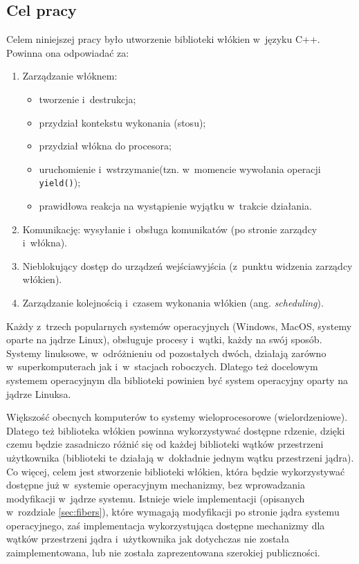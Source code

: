 \documentclass[12pt]{mwart}
\newcommand{\code}{\texttt}
\newcommand{\procbr}{()}
\newcommand{\function}[1]{\code{#1\procbr}}
\begin{document}
\subsection{Cel pracy}
\label{sec:target}
\indent
  Celem niniejszej pracy było utworzenie biblioteki włókien w~języku C++.
	Powinna ona odpowiadać za:
	\begin{enumerate}
		\item Zarządzanie włóknem:
		\begin{itemize}
			\item tworzenie i~destrukcja;
			\item przydział kontekstu wykonania (stosu);
			\item przydział włókna do procesora;
			\item uruchomienie i~wstrzymanie(tzn. w~momencie wywołania operacji \function{yield});
			\item prawidłowa reakcja na wystąpienie wyjątku w~trakcie działania.
		\end{itemize}
		\item Komunikację: wysyłanie i~obsługa komunikatów (po stronie zarządcy i~włókna).
		\item Nieblokujący dostęp do  urządzeń wejścia\dywiz wyjścia (z~punktu widzenia zarządcy włókien).
    \item Zarządzanie kolejnością i~czasem wykonania włókien (ang. \emph{scheduling}). \label{enm:timesch}
	\end{enumerate}
\par
\indent
  Każdy z~trzech popularnych systemów operacyjnych (Windows, MacOS, systemy oparte na jądrze Linux), obsługuje procesy i~wątki, każdy na swój sposób. Systemy linuksowe,
  w~odróżnieniu od pozostałych dwóch, działają zarówno w~superkomputerach jak i~w~stacjach roboczych. Dlatego też docelowym systemem operacyjnym dla biblioteki
  powinien być system operacyjny oparty na jądrze Linuksa.
\par
\indent
  Większość obecnych komputerów to systemy wieloprocesorowe (wielordzeniowe). Dlatego też biblioteka włókien powinna wykorzystywać dostępne rdzenie, dzięki czemu będzie
  zasadniczo różnić się od każdej biblioteki wątków przestrzeni użytkownika (biblioteki te działają w~dokładnie jednym wątku przestrzeni jądra).
  Co więcej, celem jest stworzenie biblioteki włókien, która będzie wykorzystywać dostępne już w~systemie operacyjnym mechanizmy, bez wprowadzania modyfikacji w~jądrze
  systemu. Istnieje wiele implementacji (opisanych w~rozdziale \ref{sec:fibers}), które wymagają modyfikacji po stronie jądra systemu operacyjnego, zaś implementacja
  wykorzystująca dostępne mechanizmy dla wątków przestrzeni jądra i~użytkownika jak dotychczas nie została zaimplementowana, lub nie została zaprezentowana szerokiej publiczności.
\par
%
\end{document}
